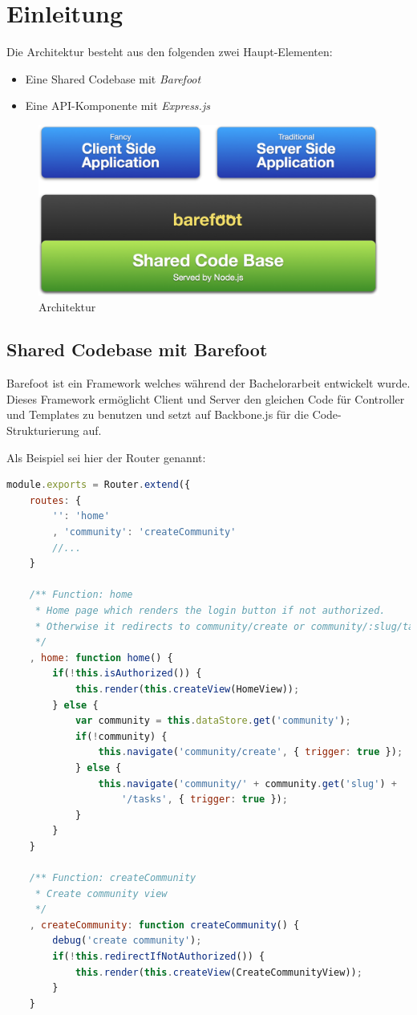 \section{Einleitung}

Die Architektur besteht aus den folgenden zwei Haupt-Elementen:
\begin{itemize}
	\item Eine Shared Codebase mit \emph{Barefoot} \cite{Barefoot}
	\item Eine API-Komponente mit \emph{Express.js} \cite{Expressjs}
\end{itemize}

\begin{figure}[ht]
	\includegraphics[width=\textwidth]{content/images/architecture.png}
	\caption{Architektur}
\end{figure}

\subsection{Shared Codebase mit Barefoot}
Barefoot \cite{Barefoot} ist ein Framework welches während der Bachelorarbeit entwickelt wurde.
Dieses Framework ermöglicht Client und Server den gleichen Code für Controller und Templates zu benutzen und setzt auf
Backbone.js \cite{Backbonejs} für die Code-Strukturierung auf.

Als Beispiel sei hier der Router genannt:
\begin{lstlisting}[language=JavaScript, caption=Router der Beispielapplikation, label=lst:roomiesRouter]
module.exports = Router.extend({
	routes: {
		'': 'home'
		, 'community': 'createCommunity'
		//...
	}

	/** Function: home
	 * Home page which renders the login button if not authorized.
	 * Otherwise it redirects to community/create or community/:slug/tasks.
	 */
	, home: function home() {
		if(!this.isAuthorized()) {
			this.render(this.createView(HomeView));
		} else {
			var community = this.dataStore.get('community');
			if(!community) {
				this.navigate('community/create', { trigger: true });
			} else {
				this.navigate('community/' + community.get('slug') +
					'/tasks', { trigger: true });
			}
		}
	}

	/** Function: createCommunity
	 * Create community view
	 */
	, createCommunity: function createCommunity() {
		debug('create community');
		if(!this.redirectIfNotAuthorized()) {
			this.render(this.createView(CreateCommunityView));
		}
	}
\end{lstlisting}

